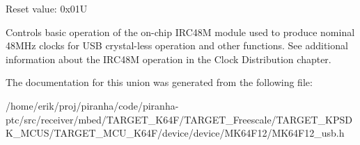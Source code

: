 Reset value\+: 0x01U

Controls basic operation of the on-\/chip I\+R\+C48M module used to produce nominal 48\+M\+Hz clocks for U\+SB crystal-\/less operation and other functions. See additional information about the I\+R\+C48M operation in the Clock Distribution chapter. 

The documentation for this union was generated from the following file\+:\begin{DoxyCompactItemize}
\item 
/home/erik/proj/piranha/code/piranha-\/ptc/src/receiver/mbed/\+T\+A\+R\+G\+E\+T\+\_\+\+K64\+F/\+T\+A\+R\+G\+E\+T\+\_\+\+Freescale/\+T\+A\+R\+G\+E\+T\+\_\+\+K\+P\+S\+D\+K\+\_\+\+M\+C\+U\+S/\+T\+A\+R\+G\+E\+T\+\_\+\+M\+C\+U\+\_\+\+K64\+F/device/device/\+M\+K64\+F12/M\+K64\+F12\+\_\+usb.\+h\end{DoxyCompactItemize}
